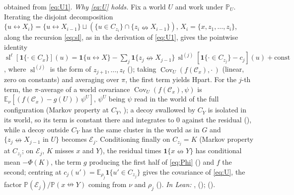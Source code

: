 \documentclass[11pt]{article}
\theoremstyle{definition}
\theoremstyle{remark}
\newcommand{\PP}{\mathbb{P}}
\newcommand{\E}{\mathbb{E}}
\DeclareMathOperator{\Cov}{Cov}
\newcommand{\con}{\leftrightarrow}
\newcommand{\ncon}{\nleftrightarrow}
\newcommand{\one}{\mathbf 1}
\newcommand{\eC}{\mathcal{C}}
\newcommand{\slf}{\operatorname{sl}}
\begin{document}
obtained from \eqref{eq:U1}.  \emph{Why \eqref{eq:U} holds.}  Fix a world $U$ and work under $\PP_U$.  Iterating the disjoint decomposition
$\{u\con X_i\}=\{u\con X_{i-1}\}\sqcup(\{u\in C_{z_i}\}\cap\{z_i\ncon X_{i-1}\})$, $X_i=\{x,z_1,\dots,z_i\}$, along the recursion \eqref{eq:sl}, as in
the derivation of \eqref{eq:U1}, gives the pointwise identity
$\slf^\ell[\one\{\cdot\in C_x\}](u)=\one\{u\con X\}-\sum_j\one\{z_j\ncon X_{j-1}\}\,\slf^{(j)}[\one\{\cdot\in C_{z_j}\}-c_j](u)+\mathrm{const}$, where
$\slf^{(j)}$ is the form of $z_{j+1},\dots,z_\ell$ (); taking $\Cov_U(f(\eC_x),\cdot\,)$ (linear, zero on constants) and
averaging over $\pi$, the first term yields Hpart.  For the $j$-th term, the $\pi$-average of a world covariance $\Cov_U(f(\eC_x),\psi)$ is
$\E_\nu[(f(\eC_x)-g(U))\,\psi^U]$, $\psi^U$ being $\psi$ read in the world of the full configuration (Markov property at $C_Y$,
); a decoy swallowed by $C_Y$ is isolated in its world, so its term is constant there and integrates to $0$ against the
residual (), while a decoy outside $C_Y$ has the same cluster in the world as in $G$ and $\{z_j\ncon X_{j-1}$ in $U\}$
becomes $\mathcal E_j$.  Conditioning finally on $C_{z_j}=K$ (Markov property at $C_{z_j}$; on $\mathcal E_j$, $K$ misses $x$ and $Y$), the residual
times $\one\{x\ncon Y\}$ has conditional mean $-\Phi(K)$, the term $g$ producing the first half of \eqref{eq:Phi} () and $f$
the second; centring at $c_j(u')=\E_{\rho_j}\one\{u'\in C_{z_j}\}$ gives the covariance of \eqref{eq:U}, the factor $\PP(\mathcal E_j)/\PP(x\ncon Y)$
coming from $\nu$ and $\rho_j$ ().
\emph{In Lean:} ,  ();  ().
\end{document}

